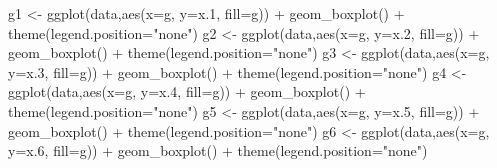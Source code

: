 \documentclass[
]{article}
\newenvironment{Shaded}{\begin{snugshade}}{\end{snugshade}}
\newcommand{\AttributeTok}[1]{\textcolor[rgb]{0.77,0.63,0.00}{#1}}
\newcommand{\FloatTok}[1]{\textcolor[rgb]{0.00,0.00,0.81}{#1}}
\newcommand{\FunctionTok}[1]{\textcolor[rgb]{0.00,0.00,0.00}{#1}}
\newcommand{\NormalTok}[1]{#1}
\newcommand{\OtherTok}[1]{\textcolor[rgb]{0.56,0.35,0.01}{#1}}
\newcommand{\SpecialCharTok}[1]{\textcolor[rgb]{0.00,0.00,0.00}{#1}}
\newcommand{\StringTok}[1]{\textcolor[rgb]{0.31,0.60,0.02}{#1}}
\begin{document}
\begin{Shaded}
\begin{Highlighting}[]
\NormalTok{g1 }\OtherTok{\textless{}{-}} \FunctionTok{ggplot}\NormalTok{(data,}\FunctionTok{aes}\NormalTok{(}\AttributeTok{x=}\NormalTok{g, }\AttributeTok{y=}\NormalTok{x}\FloatTok{.1}\NormalTok{, }\AttributeTok{fill=}\NormalTok{g)) }\SpecialCharTok{+} 
    \FunctionTok{geom\_boxplot}\NormalTok{() }\SpecialCharTok{+}
    \FunctionTok{theme}\NormalTok{(}\AttributeTok{legend.position=}\StringTok{"none"}\NormalTok{)}
\NormalTok{g2 }\OtherTok{\textless{}{-}} \FunctionTok{ggplot}\NormalTok{(data,}\FunctionTok{aes}\NormalTok{(}\AttributeTok{x=}\NormalTok{g, }\AttributeTok{y=}\NormalTok{x}\FloatTok{.2}\NormalTok{, }\AttributeTok{fill=}\NormalTok{g)) }\SpecialCharTok{+} 
    \FunctionTok{geom\_boxplot}\NormalTok{() }\SpecialCharTok{+}
    \FunctionTok{theme}\NormalTok{(}\AttributeTok{legend.position=}\StringTok{"none"}\NormalTok{)}
\NormalTok{g3 }\OtherTok{\textless{}{-}} \FunctionTok{ggplot}\NormalTok{(data,}\FunctionTok{aes}\NormalTok{(}\AttributeTok{x=}\NormalTok{g, }\AttributeTok{y=}\NormalTok{x}\FloatTok{.3}\NormalTok{, }\AttributeTok{fill=}\NormalTok{g)) }\SpecialCharTok{+} 
    \FunctionTok{geom\_boxplot}\NormalTok{() }\SpecialCharTok{+}
    \FunctionTok{theme}\NormalTok{(}\AttributeTok{legend.position=}\StringTok{"none"}\NormalTok{)}
\NormalTok{g4 }\OtherTok{\textless{}{-}} \FunctionTok{ggplot}\NormalTok{(data,}\FunctionTok{aes}\NormalTok{(}\AttributeTok{x=}\NormalTok{g, }\AttributeTok{y=}\NormalTok{x}\FloatTok{.4}\NormalTok{, }\AttributeTok{fill=}\NormalTok{g)) }\SpecialCharTok{+} 
    \FunctionTok{geom\_boxplot}\NormalTok{() }\SpecialCharTok{+}
    \FunctionTok{theme}\NormalTok{(}\AttributeTok{legend.position=}\StringTok{"none"}\NormalTok{)}
\NormalTok{g5 }\OtherTok{\textless{}{-}} \FunctionTok{ggplot}\NormalTok{(data,}\FunctionTok{aes}\NormalTok{(}\AttributeTok{x=}\NormalTok{g, }\AttributeTok{y=}\NormalTok{x}\FloatTok{.5}\NormalTok{, }\AttributeTok{fill=}\NormalTok{g)) }\SpecialCharTok{+} 
    \FunctionTok{geom\_boxplot}\NormalTok{() }\SpecialCharTok{+}
    \FunctionTok{theme}\NormalTok{(}\AttributeTok{legend.position=}\StringTok{"none"}\NormalTok{)}
\NormalTok{g6 }\OtherTok{\textless{}{-}} \FunctionTok{ggplot}\NormalTok{(data,}\FunctionTok{aes}\NormalTok{(}\AttributeTok{x=}\NormalTok{g, }\AttributeTok{y=}\NormalTok{x}\FloatTok{.6}\NormalTok{, }\AttributeTok{fill=}\NormalTok{g)) }\SpecialCharTok{+} 
    \FunctionTok{geom\_boxplot}\NormalTok{() }\SpecialCharTok{+}
    \FunctionTok{theme}\NormalTok{(}\AttributeTok{legend.position=}\StringTok{"none"}\NormalTok{)}

\end{Highlighting}
\end{Shaded}
\end{document}
